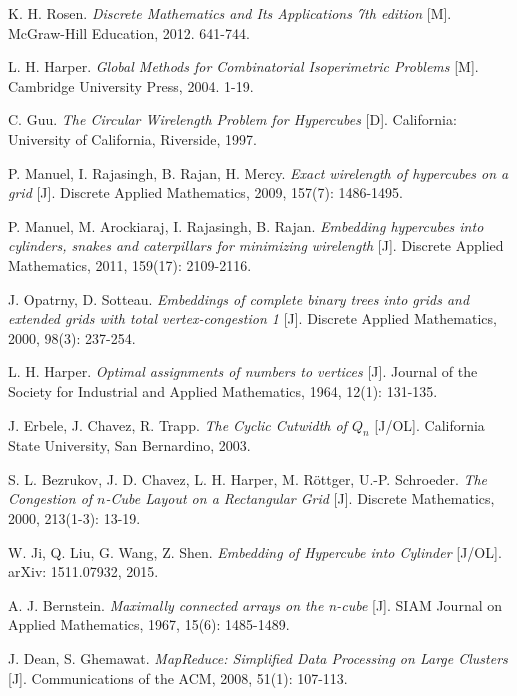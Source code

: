 
\begin{thebibliography}{99}

	K. H. Rosen.
	\emph{Discrete Mathematics and Its Applications 7th edition} [M].
	McGraw-Hill Education, 2012. 641-744.

	L. H. Harper.
	\emph{Global Methods for Combinatorial Isoperimetric Problems} [M].
	Cambridge University Press, 2004. 1-19.

	C. Guu.
	\emph{The Circular Wirelength Problem for Hypercubes} [D].
	California: University of California, Riverside, 1997.

	P. Manuel, I. Rajasingh, B. Rajan, H. Mercy.
	\emph{Exact wirelength of hypercubes on a grid} [J].
	Discrete Applied Mathematics, 2009, 157(7): 1486-1495.

	P. Manuel, M. Arockiaraj, I. Rajasingh, B. Rajan.
	\emph{Embedding hypercubes into cylinders, snakes and caterpillars for
	minimizing wirelength} [J].
	Discrete Applied Mathematics, 2011, 159(17): 2109-2116.

	J. Opatrny, D. Sotteau.
	\emph{Embeddings of complete binary trees into grids and extended grids
	with total vertex-congestion 1} [J].
	Discrete Applied Mathematics, 2000, 98(3): 237-254.

	L. H. Harper.
	\emph{Optimal assignments of numbers to vertices} [J].
	Journal of the Society for Industrial and Applied Mathematics,
	1964, 12(1): 131-135.

	J. Erbele, J. Chavez, R. Trapp.
	\emph{The Cyclic Cutwidth of $Q_n$} [J/OL].
	California State University, San Bernardino, 2003.

	S. L. Bezrukov, J. D. Chavez, L. H. Harper, M. Röttger, U.-P. Schroeder.
	\emph{The Congestion of $n$-Cube Layout on a Rectangular Grid} [J].
	Discrete Mathematics, 2000, 213(1-3): 13-19.

	W. Ji, Q. Liu, G. Wang, Z. Shen.
	\emph{Embedding of Hypercube into Cylinder} [J/OL].
	arXiv: 1511.07932, 2015.

	A. J. Bernstein.
	\emph{Maximally connected arrays on the n-cube} [J].
	SIAM Journal on Applied Mathematics, 1967, 15(6): 1485-1489.

	J. Dean, S. Ghemawat.
	\emph{MapReduce: Simplified Data Processing on Large Clusters} [J].
	Communications of the ACM, 2008, 51(1): 107-113.


\end{thebibliography}
